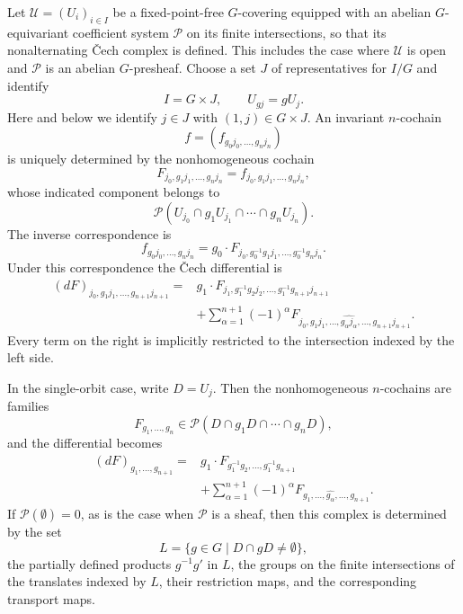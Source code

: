 \begin{lemma}
\label{lemma-equivariant-cech-nonhomogeneous-cochains}
\begin{reference}
\cite[Chapter V, \S 5.5, (5.5.9)--(5.5.11),
pp. 210--211]{Tohoku}
\end{reference}
Let $\mathcal{U}=(U_i)_{i\in I}$ be a fixed-point-free $G$-covering
equipped with an abelian $G$-equivariant coefficient system
$\mathcal{P}$ on its finite intersections, so that its nonalternating
\v Cech complex is defined. This includes the case where $\mathcal{U}$ is
open and $\mathcal{P}$ is an abelian $G$-presheaf. Choose a set $J$ of
representatives for $I/G$ and identify
$$
I=G\times J,
\qquad
U_{g j}=gU_j.
$$
Here and below we identify $j\in J$ with $(1,j)\in G\times J$.
An invariant $n$-cochain
$$
f=(f_{g_0j_0,\ldots,g_nj_n})
$$
is uniquely determined by the nonhomogeneous cochain
\begin{equation}
\label{equation-equivariant-cech-nonhomogeneous-restriction}
F_{j_0,g_1j_1,\ldots,g_nj_n}
=f_{j_0,g_1j_1,\ldots,g_nj_n},
\end{equation}
whose indicated component belongs to
$$
\mathcal{P}(U_{j_0}\cap g_1U_{j_1}\cap\cdots\cap g_nU_{j_n}).
$$
The inverse correspondence is
\begin{equation}
\label{equation-equivariant-cech-nonhomogeneous-reconstruction}
f_{g_0j_0,\ldots,g_nj_n}
=g_0\cdot
F_{j_0,g_0^{-1}g_1j_1,\ldots,g_0^{-1}g_nj_n}.
\end{equation}
Under this correspondence the \v Cech differential is
\begin{equation}
\label{equation-equivariant-cech-nonhomogeneous-differential}
\begin{aligned}
(dF)_{j_0,g_1j_1,\ldots,g_{n+1}j_{n+1}}
={}&g_1\cdot
F_{j_1,g_1^{-1}g_2j_2,\ldots,
g_1^{-1}g_{n+1}j_{n+1}} \\
&+\sum_{\alpha=1}^{n+1}(-1)^\alpha
F_{j_0,g_1j_1,\ldots,
\widehat{g_\alpha j_\alpha},\ldots,
g_{n+1}j_{n+1}}.
\end{aligned}
\end{equation}
Every term on the right is implicitly restricted to the intersection
indexed by the left side.

In the single-orbit case, write $D=U_j$. Then the nonhomogeneous
$n$-cochains are families
$$
F_{g_1,\ldots,g_n}
\in
\mathcal{P}(D\cap g_1D\cap\cdots\cap g_nD),
$$
and the differential becomes
\begin{equation}
\label{equation-equivariant-cech-nonhomogeneous-single-orbit}
\begin{aligned}
(dF)_{g_1,\ldots,g_{n+1}}
={}&g_1\cdot
F_{g_1^{-1}g_2,\ldots,g_1^{-1}g_{n+1}} \\
&+\sum_{\alpha=1}^{n+1}(-1)^\alpha
F_{g_1,\ldots,\widehat{g_\alpha},\ldots,g_{n+1}}.
\end{aligned}
\end{equation}
If $\mathcal{P}(\emptyset)=0$, as is the case when $\mathcal{P}$ is a
sheaf, then this complex is determined by the set
$$
L=\{g\in G\mid D\cap gD\neq\emptyset\},
$$
the partially defined products $g^{-1}g'$ in $L$, the groups on the
finite intersections of the translates indexed by $L$, their restriction
maps, and the corresponding transport maps.
\end{lemma}

